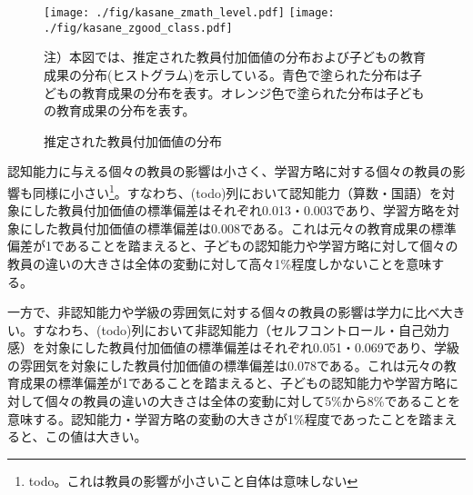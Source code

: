 \documentclass[a4paper,12pt]{article}
\begin{document}
\begin{figure}
\centering
\texttt{[image: ./fig/kasane\_zmath\_level.pdf]}
\texttt{[image: ./fig/kasane\_zgood\_class.pdf]}
\label{fig:kasane}
\caption{推定された教員付加価値の分布}
\footnotesize{
注）本図では、推定された教員付加価値の分布および子どもの教育成果の分布(ヒストグラム)を示している。青色で塗られた分布は子どもの教育成果の分布を表す。オレンジ色で塗られた分布は子どもの教育成果の分布を表す。
}
\end{figure}

認知能力に与える個々の教員の影響は小さく、学習方略に対する個々の教員の影響も同様に小さい\footnote{todo。これは教員の影響が小さいこと自体は意味しない}。すなわち、(todo)列において認知能力（算数・国語）を対象にした教員付加価値の標準偏差はそれぞれ0.013・0.003であり、学習方略を対象にした教員付加価値の標準偏差は0.008である。これは元々の教育成果の標準偏差が1であることを踏まえると、子どもの認知能力や学習方略に対して個々の教員の違いの大きさは全体の変動に対して高々1\%程度しかないことを意味する。



一方で、非認知能力や学級の雰囲気に対する個々の教員の影響は学力に比べ大きい。すなわち、(todo)列において非認知能力（セルフコントロール・自己効力感）を対象にした教員付加価値の標準偏差はそれぞれ0.051・0.069であり、学級の雰囲気を対象にした教員付加価値の標準偏差は0.078である。これは元々の教育成果の標準偏差が1であることを踏まえると、子どもの認知能力や学習方略に対して個々の教員の違いの大きさは全体の変動に対して5\%から8\%であることを意味する。認知能力・学習方略の変動の大きさが1\%程度であったことを踏まえると、この値は大きい。
\end{document}
